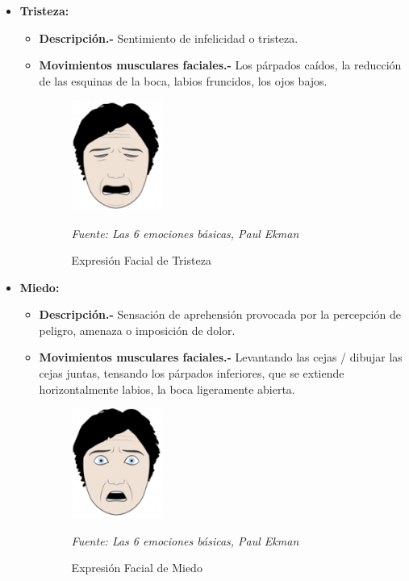 \begin{itemize}
\item {\textbf{Tristeza:} 
\begin{itemize}
\item \textbf{Descripción.-} Sentimiento de infelicidad o tristeza.
\item { \textbf{Movimientos musculares faciales.-} Los párpados caídos, la reducción de las esquinas de la boca, labios fruncidos, los ojos bajos.

\begin{figure}[H]
		\centering
		\includegraphics[width=30mm]{./Imagenes/tristeza.png}
		\caption{Expresión Facial de Tristeza}
		\vspace{0.15cm}
		\textit{Fuente: Las 6 emociones básicas, Paul Ekman}
		\label{fig:tristeza}
\end{figure}}
\end{itemize}}


\item {\textbf{Miedo:} 
\begin{itemize}
\item \textbf{Descripción.-} Sensación de aprehensión provocada por la percepción de peligro, amenaza o imposición de dolor.
\item { \textbf{Movimientos musculares faciales.-} Levantando las cejas / dibujar las cejas juntas, tensando los párpados inferiores, que se extiende horizontalmente labios, la boca ligeramente abierta.

\begin{figure}[H]
		\centering
		\includegraphics[width=30mm]{./Imagenes/miedo.png}
		\caption{Expresión Facial de Miedo}
		\vspace{0.15cm}
		\textit{Fuente: Las 6 emociones básicas, Paul Ekman}
		\label{fig:miedo}
\end{figure}}
\end{itemize}}

\end{itemize}


